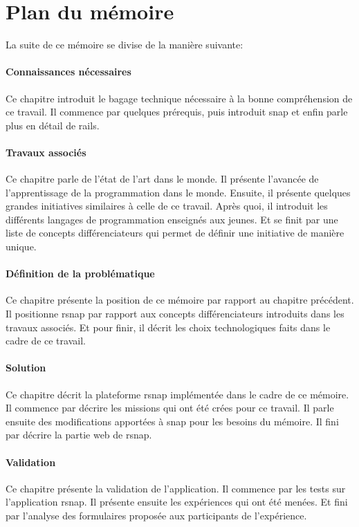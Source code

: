 \section{Plan du mémoire}
La suite de ce mémoire se divise de la manière suivante:

\paragraph{Connaissances nécessaires}
Ce chapitre introduit le bagage technique nécessaire à la bonne compréhension de ce travail. Il commence par quelques prérequis, puis introduit \gls{snap} et enfin parle plus en détail de \gls{rails}.

\paragraph{Travaux associés}
Ce chapitre parle de l'état de l'art dans le monde. Il présente l'avancée de l'apprentissage de la programmation dans le monde. Ensuite, il présente quelques grandes initiatives similaires à celle de ce travail. Après quoi, il introduit les différents langages de programmation enseignés aux jeunes. Et se finit par une liste de concepts différenciateurs qui permet de définir une initiative de manière unique.

\paragraph{Définition de la problématique}
Ce chapitre présente la position de ce mémoire par rapport au chapitre précédent. Il positionne \gls{rsnap} par rapport aux concepts différenciateurs introduits dans les travaux associés. Et pour finir, il décrit les choix technologiques faits dans le cadre de ce travail.

\paragraph{Solution}
Ce chapitre décrit la plateforme \gls{rsnap} implémentée dans le cadre de ce mémoire.
Il commence par décrire les \glspl{mission} qui ont été crées pour ce travail. Il parle ensuite des modifications apportées à \gls{snap} pour les besoins du mémoire. Il fini par décrire la partie web de \gls{rsnap}.

\paragraph{Validation}
Ce chapitre présente la validation de l'application. Il commence par les tests sur l'application \gls{rsnap}. Il présente ensuite les expériences qui ont été menées. Et fini par l'analyse des formulaires proposée aux participants de l'expérience.

